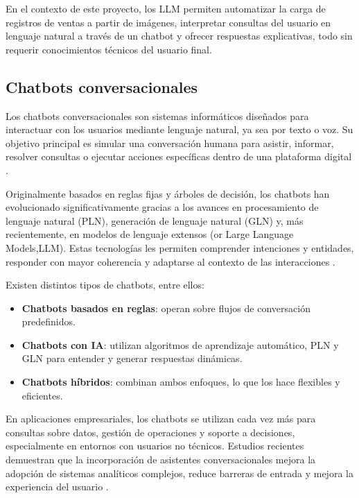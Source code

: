 \indent En el contexto de este proyecto, los LLM permiten automatizar la carga de registros de ventas a partir de imágenes, interpretar consultas del usuario en lenguaje natural a través de un chatbot y ofrecer respuestas explicativas, todo sin requerir conocimientos técnicos del usuario final.

\subsection{Chatbots conversacionales}

Los chatbots conversacionales son sistemas informáticos diseñados para interactuar con los usuarios mediante lenguaje natural, ya sea por texto o voz. Su objetivo principal es simular una conversación humana para asistir, informar, resolver consultas o ejecutar acciones específicas dentro de una plataforma digital \parencite{radziwill2017}.

Originalmente basados en reglas fijas y árboles de decisión, los chatbots han evolucionado significativamente gracias a los avances en procesamiento de lenguaje natural (PLN), generación de lenguaje natural (GLN) y, más recientemente, en modelos de lenguaje extensos (or Large Language Models,LLM). Estas tecnologías les permiten comprender intenciones y entidades, responder con mayor coherencia y adaptarse al contexto de las interacciones \parencite{shum2018}.

Existen distintos tipos de chatbots, entre ellos:

\begin{itemize}
    \item \textbf{Chatbots basados en reglas}: operan sobre flujos de conversación predefinidos.
    
    \item \textbf{Chatbots con IA}: utilizan algoritmos de aprendizaje automático, PLN y GLN para entender y generar respuestas dinámicas.
    
    \item \textbf{Chatbots híbridos}: combinan ambos enfoques, lo que los hace flexibles y eficientes.
\end{itemize}

En aplicaciones empresariales, los chatbots se utilizan cada vez más para consultas sobre datos, gestión de operaciones y soporte a decisiones, especialmente en entornos con usuarios no técnicos. Estudios recientes demuestran que la incorporación de asistentes conversacionales mejora la adopción de sistemas analíticos complejos, reduce barreras de entrada y mejora la experiencia del usuario \parencite{knote2021}.

